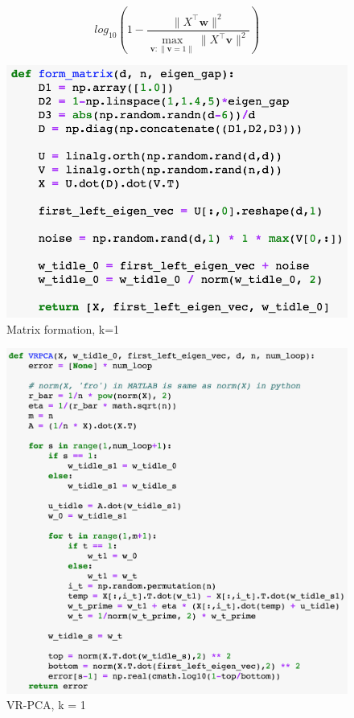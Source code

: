 \documentclass{article}
\begin{document}
\begin{equation}
    log_{10}(1-\frac{\|X^\top\textbf{w}\|^2}{\underset{\textbf{v}:\|\textbf{v}=1\|}{\max}\|X^\top \textbf{v}\|^2})
\end{equation}
\clearpage
\begin{figure}[H]
    \centering
    \includegraphics[scale=0.5]{./form_matrix1.png}
    \caption{Matrix formation, k=1}
\end{figure}
\begin{figure}[H]
    \centering
    \includegraphics[scale=0.45]{./VRPCA1.png}
    \caption{VR-PCA, k = 1}
\end{figure}
\end{document}
